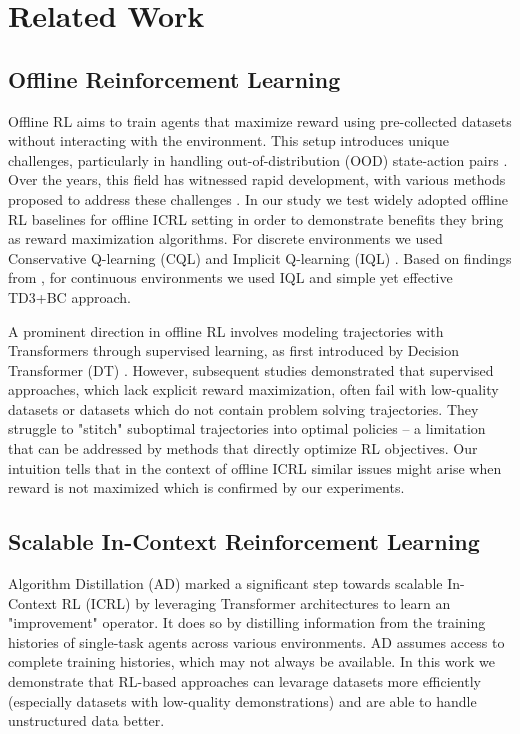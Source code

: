 \section{Related Work}
\label{related}
\subsection{Offline Reinforcement Learning}
Offline RL aims to train agents that maximize reward using pre-collected datasets without interacting with the environment. This setup introduces unique challenges, particularly in handling out-of-distribution (OOD) state-action pairs \citep{levine2020offline}. Over the years, this field has witnessed rapid development, with various methods proposed to address these challenges \citep{kumar2020conservative, an2021uncertainty, kostrikov2021offline, fujimoto2021minimalist}. In our study we test widely adopted offline RL baselines for offline ICRL setting in order to demonstrate benefits they bring as reward maximization algorithms. For discrete environments we used Conservative Q-learning (CQL) \citep{kumar2020conservative} and Implicit Q-learning (IQL) \citep{kostrikov2021offline}. Based on findings from \citet{tarasov2024corl}, for continuous environments we used IQL and simple yet effective \citep{tarasov2024revisiting} TD3+BC \citep{fujimoto2021minimalist} approach.

A prominent direction in offline RL involves modeling trajectories with Transformers through supervised learning, as first introduced by Decision Transformer (DT) \citep{chen2021decision}. However, subsequent studies \citep{yamagata2023q, hu2024q, zhuang2024reinformer} demonstrated that supervised approaches, which lack explicit reward maximization, often fail with low-quality datasets or datasets which do not contain problem solving trajectories. They struggle to "stitch" suboptimal trajectories into optimal policies -- a limitation that can be addressed by methods that directly optimize RL objectives. Our intuition tells that in the context of offline ICRL similar issues might arise when reward is not maximized which is confirmed by our experiments.

\subsection{Scalable In-Context Reinforcement Learning}
Algorithm Distillation (AD) \citep{laskin2022context} marked a significant step towards scalable In-Context RL (ICRL) by leveraging Transformer architectures to learn an "improvement" operator. It does so by distilling information from the training histories of single-task agents across various environments. AD assumes access to complete training histories, which may not always be available. In this work we demonstrate that RL-based approaches can levarage datasets more efficiently (especially datasets with low-quality demonstrations) and are able to handle unstructured data better.

